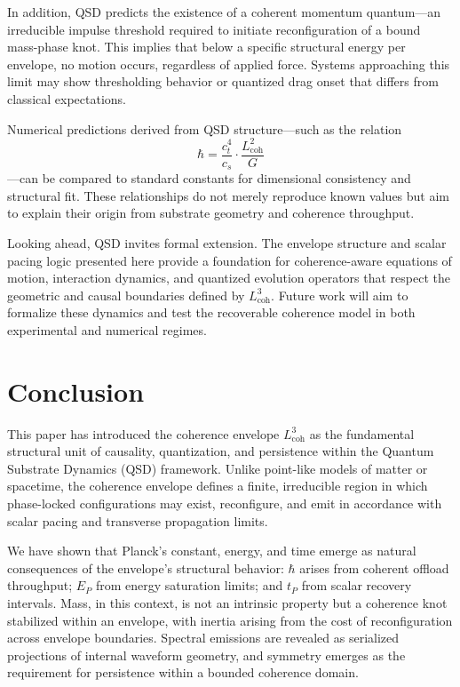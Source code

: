 \documentclass[entropy,article,submit,pdftex,moreauthors]{Definitions/mdpi}
\begin{document}
In addition, QSD predicts the existence of a coherent momentum quantum—an irreducible impulse threshold required to initiate reconfiguration of a bound mass-phase knot. This implies that below a specific structural energy per envelope, no motion occurs, regardless of applied force. Systems approaching this limit may show thresholding behavior or quantized drag onset that differs from classical expectations.

Numerical predictions derived from QSD structure—such as the relation \[
 \hbar = \frac{c_t^4}{c_s} \cdot \frac{L_{\text{coh}}^2}{G} 
\] —can be compared to standard constants for dimensional consistency and structural fit. These relationships do not merely reproduce known values but aim to explain their origin from substrate geometry and coherence throughput.

Looking ahead, QSD invites formal extension. The envelope structure and scalar pacing logic presented here provide a foundation for coherence-aware equations of motion, interaction dynamics, and quantized evolution operators that respect the geometric and causal boundaries defined by \( L_{\text{coh}}^3 \). Future work will aim to formalize these dynamics and test the recoverable coherence model in both experimental and numerical regimes.




\section{Conclusion}
This paper has introduced the coherence envelope \texorpdfstring{\( L_{\text{coh}}^3 \)}{Lcoh\^{}3} as the fundamental structural unit of causality, quantization, and persistence within the Quantum Substrate Dynamics (QSD) framework. Unlike point-like models of matter or spacetime, the coherence envelope defines a finite, irreducible region in which phase-locked configurations may exist, reconfigure, and emit in accordance with scalar pacing and transverse propagation limits.

We have shown that Planck’s constant, energy, and time emerge as natural consequences of the envelope’s structural behavior: \texorpdfstring{\( \hbar \)}{hbar} arises from coherent offload throughput; \texorpdfstring{\( E_P \)}{Ep} from energy saturation limits; and \texorpdfstring{\( t_P \)}{tP} from scalar recovery intervals. Mass, in this context, is not an intrinsic property but a coherence knot stabilized within an envelope, with inertia arising from the cost of reconfiguration across envelope boundaries. Spectral emissions are revealed as serialized projections of internal waveform geometry, and symmetry emerges as the requirement for persistence within a bounded coherence domain.
\end{document}
